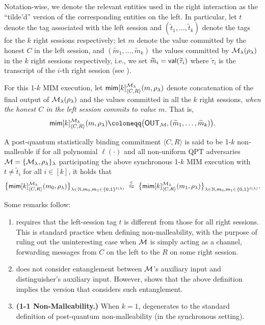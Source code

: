 Notation-wise, we denote the relevant entities used in the right interaction as the ``tilde'd'' version of the corresponding entities on the left. In particular, let $t$ denote the tag associated with the left session and $(\tilde{t}_1, \ldots, \tilde{t}_k)$ denote the tags for the $k$ right sessions respectively; let $m$ denote the value committed by the honest $C$ in the left session, and $(\tilde{m}_1, \ldots, \tilde{m}_k)$ the values committed by $\mathcal{M}_{\lambda}(\rho_\lambda)$ in the $k$ right sessions respectively, i.e., we set $\widetilde{m}_i=\mathsf{val}(\widetilde{\tau}_i)$ where $\tilde{\tau}_i$ is the transcript of the $i$-th right session (see ). 

For this 1-$k$ MIM execution, let $\mathsf{mim}[k]^{\mathcal{M}_\lambda}_{\langle C, R \rangle}(m, \rho_\lambda)$ denote concatenation of the final output of $\mathcal{M}_\lambda(\rho_\lambda)$ and the values committed in all the $k$ right sessions, {\em when the honest $C$ in the left session commits to value $m$}. That is, 
$$\msf{mim}[k]^{\mcal{M}_\secpar}_{\langle C, R \rangle}(m, \rho_\secpar)\coloneqq \big(\OUT_{\mcal{M}}, (\tilde{m}_1, \ldots, \tilde{m}_k) \big).$$

 
\begin{definition}\label{def:NMCom:pq}
A post-quantum statistically binding commitment $\langle C, R \rangle$ is said to be 1-$k$ non-malleable if for all polynomial $\ell(\cdot)$ and all non-uniform QPT adversaries $\mathcal{M} = \{\mathcal{M}_\lambda, \rho_\lambda\}_\lambda$ participating the above synchronous 1-$k$ MIM execution with $t \ne \tilde{t}_i$ for all $i \in [k]$, it holds that
$$\big\{\mathsf{mim}[k]^{\mathcal{M}_\lambda}_{\langle C, R \rangle}(m_0, \rho_\lambda)\big\}_{\lambda \in \mathbb{N}, m_0, m_1 \in \{0,1\}^{\ell(\lambda)}} ~\stackrel{\text{c}}{\approx}~ \big\{\mathsf{mim}[k]^{\mathcal{M}_\lambda}_{\langle C, R \rangle}( m_1, \rho_\lambda)\big\}_{\lambda \in \mathbb{N}, m_0, m_1 \in \{0,1\}^{\ell(\lambda)}}.$$
\end{definition}
Some remarks follow:
\begin{enumerate}
\item 
{} requires that the left-session tag $t$ is different from those for all right sessions. This is standard practice when defining non-malleability, with the purpose of ruling out the uninteresting case when $\mathcal{M}$ is simply acting as a channel, forwarding messages from $C$ on the left to the $R$ on some right session. 
\item 
  does not consider entanglement between $\mathcal{M}$'s auxiliary input and distinguisher's auxiliary input. However, \cite[Claim 3.1]{EC:BitLinShm22} shows that the above definition implies the version that considers such entanglement.  
 \item 
 {\bf (1-1 Non-Malleability.)}
 When $k=1$,  degenerates to the standard definition of post-quantum non-malleability (in the synchronous setting).
 \end{enumerate} 

